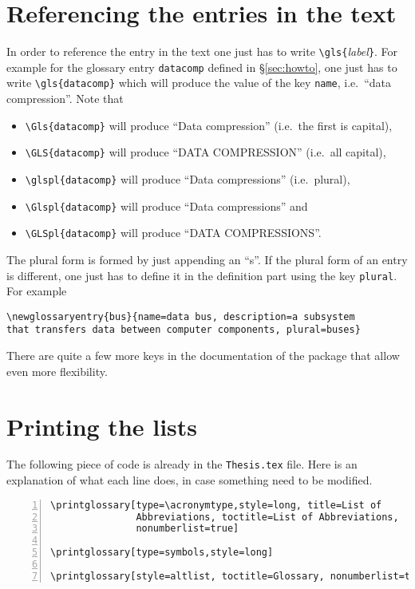 \section{Referencing the entries in the text}
In order to reference the entry in the text one just has to write \texttt{\textbackslash gls\{}\textit{label}\texttt{\}}. For example for the glossary entry \texttt{datacomp} defined in \S\ref{sec:howto}, one just has to write \texttt{\textbackslash gls\{datacomp\}}
which will produce the value of the key \texttt{name}, i.e.\ ``data compression''. Note that 
\begin{itemize}
   \item \texttt{\textbackslash Gls\{datacomp\}} will produce ``Data compression'' (i.e.\ the first is capital), 
   \item \texttt{\textbackslash GLS\{datacomp\}} will produce ``DATA COMPRESSION'' (i.e.\ all capital), 
   \item \texttt{\textbackslash glspl\{datacomp\}} will produce ``Data compressions'' (i.e.\ plural),
   \item \texttt{\textbackslash Glspl\{datacomp\}} will produce ``Data compressions'' and
   \item \texttt{\textbackslash GLSpl\{datacomp\}} will produce ``DATA COMPRESSIONS''.
\end{itemize}
The plural form is formed by just appending an ``s''. If the plural form of an entry is different, one just has to define it in the definition part using the key \texttt{plural}. For example
\begin{lstlisting}
\newglossaryentry{bus}{name=data bus, description=a subsystem 
that transfers data between computer components, plural=buses}
\end{lstlisting}

There are quite a few more keys in the documentation of the package that allow even more flexibility.


\section{Printing the lists}\label{sec:printlists}
The following piece of code is already in the \texttt{Thesis.tex} file. Here is an explanation of what each line does, in case something need to be modified.

\begin{lstlisting}[numbers=left,numberstyle=\footnotesize]
\printglossary[type=\acronymtype,style=long, title=List of 
               Abbreviations, toctitle=List of Abbreviations, 
               nonumberlist=true] 

\printglossary[type=symbols,style=long]   

\printglossary[style=altlist, toctitle=Glossary, nonumberlist=true] 
\end{lstlisting}

